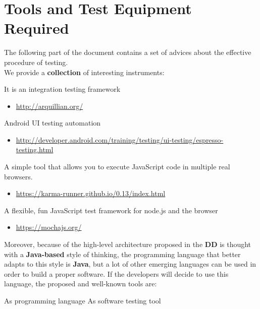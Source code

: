 \section{Tools and Test Equipment Required}

The following part of the document contains a set of advices about the effective procedure of testing.\\ We provide a \textbf{collection} of interesting instruments:
\begin{itemize}
	  It is an integration testing framework
	\begin{itemize}
		\item \href{http://arquillian.org/}{http://arquillian.org/}
	\end{itemize}
	 Android UI testing automation
	\begin{itemize}
		\item \href{http://developer.android.com/training/testing/ui-testing/espresso-testing.html}{http://developer.android.com/training/testing/ui-testing/espresso-testing.html}
	\end{itemize}
	 A simple tool that allows you to execute JavaScript code in multiple real browsers.
	\begin{itemize}
		\item \href{https://karma-runner.github.io/0.13/index.html}{https://karma-runner.github.io/0.13/index.html}
	\end{itemize}
	 A flexible, fun JavaScript test framework for node.js and the browser
	\begin{itemize}
		\item \href{https://mochajs.org/}{https://mochajs.org/}
	\end{itemize}
\end{itemize}

Moreover, because of the high-level architecture proposed in the \textbf{DD} is thought with a \textbf{Java-based} style of thinking, the programming language that better adapts to this style is \textbf{Java}, but a lot of other emerging languages can be used in order to build a proper software. If the developers will decide to use this language, the proposed and well-known tools are:
\begin{itemize}
	 As programming language
	 As software testing tool
\end{itemize}